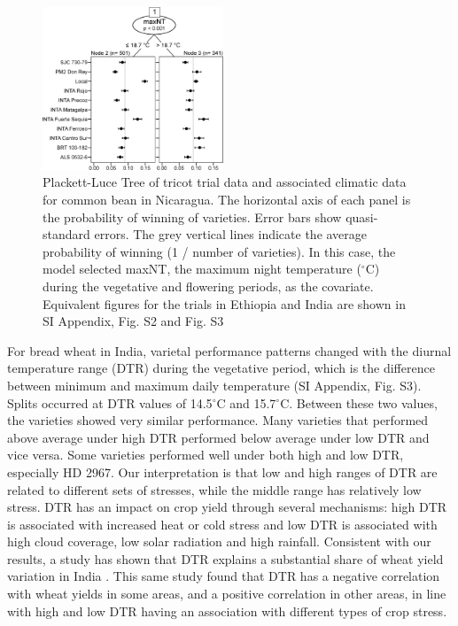 \documentclass[9pt,twocolumn,twoside]{pnas-new}
\begin{document}
\begin{figure}[ht!]
\centering
\includegraphics[width=0.48\textwidth]{Fig2_PLTrees.eps}
\caption{Plackett-Luce Tree of tricot trial data and associated climatic data for common bean in Nicaragua. The horizontal axis of each panel is the probability of winning of varieties. Error bars show quasi-standard errors. The grey vertical lines indicate the average probability of winning (1 / number of varieties). In this case, the model selected maxNT, the maximum night temperature ($^{\circ}$C) during the vegetative and flowering periods, as the covariate. Equivalent figures for the trials in Ethiopia and India are shown in SI Appendix, Fig. S2 and Fig. S3}
\label{fig:trees}
\end{figure}

For bread wheat in India, varietal performance patterns changed with the diurnal temperature range (DTR) during the vegetative period, which is the difference between minimum and maximum daily temperature (SI Appendix, Fig. S3). Splits occurred at DTR values of 14.5$^{\circ}$C and 15.7$^{\circ}$C. Between these two values, the varieties showed very similar performance. Many varieties that performed above average under high DTR performed below average under low DTR and vice versa. Some varieties performed well under both high and low DTR, especially HD 2967. Our interpretation is that low and high ranges of DTR are related to different sets of stresses, while the middle range has relatively low stress. DTR has an impact on crop yield through several mechanisms: high DTR is associated with increased heat or cold stress and low DTR is associated with high cloud coverage, low solar radiation and high rainfall. Consistent with our results, a study has shown that DTR explains a substantial share of wheat yield variation in India \cite{rao2015spatial}. This same study found that DTR has a negative correlation with wheat yields in some areas, and a positive correlation in other areas, in line with high and low DTR having an association with different types of crop stress.
\end{document}
